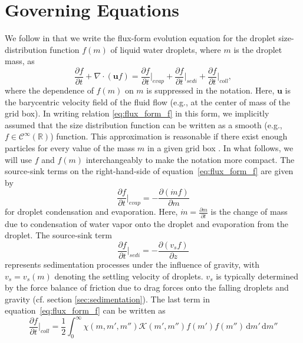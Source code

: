 \documentclass{report}
\begin{document}
\section{Governing Equations}
We follow \citep{} in that we write the flux-form evolution equation for the droplet size-distribution function $f(m)$ of liquid water droplets, where $m$ is the droplet mass, as 
\begin{equation}
    \frac{\partial f}{\partial t} +\nabla \cdot (\mathbf{u} f) = \frac{\partial f}{\partial t} \biggr\rvert_{evap} + \frac{\partial f}{\partial t} \biggr\rvert_{sedi} + \frac{\partial f}{\partial t} \biggr\rvert_{coll}, 
    \label{eq:flux_form_f}
\end{equation}
where the dependence of $f(m)$ on $m$ is suppressed in the notation. Here, $\mathbf{u}$ is the barycentric velocity field of the fluid flow (e.g., at the center of mass of the grid box). In writing relation \eqref{eq:flux_form_f} in this form, we implicitly assumed that the size distribution function can be written as a smooth (e.g., $f \in \mathcal{C}^\infty(\mathbb{R})$) function. This approximation is reasonable if there exist enough particles for every value of the mass $m$ in a given grid box \citep[cf.][]{Beheng10}. In what follows, we will use $f$ and $f(m)$ interchangeably to make the notation more compact. The source-sink terms on the right-hand-side of equation~\eqref{eq:flux_form_f} are given by
\begin{equation}
    \frac{\partial f}{\partial t} \biggr\rvert_{evap} = -\frac{\partial (\dot{m} f)}{\partial m}
    \label{eq:source_evap}
\end{equation}
for droplet condensation and evaporation. Here, $\dot{m} = \frac{\partial m}{\partial t}$ is the change of mass due to condensation of water vapor onto the droplet and evaporation from the droplet. The source-sink term 
\begin{equation}
    \frac{\partial f}{\partial t} \biggr\rvert_{sedi} = -\frac{\partial(v_sf)}{\partial z}
    \label{eq:source_sedi}
\end{equation}
represents sedimentation processes under the influence of gravity, with $v_s = v_s(m)$ denoting the settling velocity of droplets. $v_s$ is typically determined by the force balance of friction due to drag forces onto the falling droplets and gravity (cf. section \ref{sec:sedimentation}). The last term in equation~\eqref{eq:flux_form_f} can be written as
\begin{equation}
    \frac{\partial f}{\partial t} \biggr\rvert_{coll} = \frac{1}{2} \int_0^\infty \chi(m,m',m'') \mathcal{K}(m', m'')f(m')f(m'') \,\text{d}m' \, \text{d}{m''}
    \label{eq:source_cb}
\end{equation}
\end{document}

